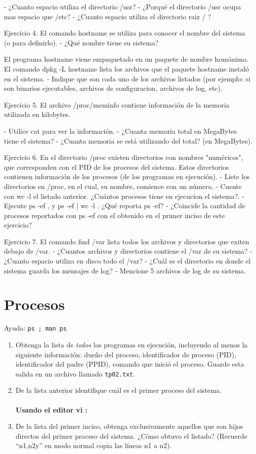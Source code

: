 \documentclass[12pt]{article}
\begin{document}
- ¿Cuanto espacio utiliza el directorio /usr?
- ¿Porqué el directorio /usr ocupa mas espacio que /etc?
- ¿Cuanto espacio utiliza el directorio raiz / ?


Ejercicio 4.
El comando hostname se utiliza para conocer el nombre del sistema (o para definirlo).
- ¿Qué nombre tiene su sistema?

El programa hostname viene empaquetado en un paquete de nombre homónimo.
El comando dpkg -L hostname  lista los archivos que el paquete hostname instaló en el sistema.
- Indique que son cada uno de los archivos listados (por ejemplo: si son binarios ejecutables, archivos de configuracion, archivos de log, etc).



Ejercicio 5.
El archivo /proc/meminfo contiene información de la memoria utilizada en kilobytes.

- Utilice cat para ver la información.
- ¿Cuanta memoria total en MegaBytes tiene el sistema?
- ¿Cuanta memoria se está utilizando del total? (en MegaBytes).


Ejercicio 6.
En el directorio /proc existen directorios con nombres "numéricos", que corresponden con el PID de los procesos del sistema.
Estos directorios contienen información de los procesos (de los programas en ejecución).
- Liste los directorios en /proc, en el cual, su nombre, comience con un número.
- Cuente con wc -l el listado anterior. ¿Cuántos procesos tiene en ejecucion el sistema?.
- Ejecute ps -ef , y ps -ef | wc -l . ¿Qué reporta ps -ef?
- ¿Coincide la cantidad de procesos reportados con ps -ef con el obtenido en el primer inciso de este ejercicio?


Ejercicio 7.
El comando find /var lista todos los archivos y directorios que exiten debajo de /var.
- ¿Cuantos archivos y directorios contiene el /var de su sistema?
- ¿Cuanto espacio utiliza en disco todo el /var?
- ¿Cuál es el directorio en donde el sistema guarda los mensajes de log?
- Mencione 5 archivos de log de su sistema.







\section*{Procesos}
Ayuda: \texttt{ps ; man ps}
\begin{enumerate}
\item Obtenga la lista de \textit{todos} los programas en ejecución, incluyendo al menos la siguiente información:
dueño del proceso, identificador de proceso (PID), identificador del padre (PPID),
comando que inició el proceso. Guarde esta salida en un archivo llamado \texttt{tp02.txt}.
\item De la lista anterior identifique cuál es el primer proceso del sistema. \\ \\
\textbf{Usando el editor vi :} 
\item De la lista del primer inciso, obtenga exclusivamente aquellos que son hijos directos del primer proceso del sistema. ¿Cómo obtuvo el listado? (Recuerde ``n1,n2y'' en modo normal copia las líneas n1 a n2).
\end{enumerate}
\end{document}
